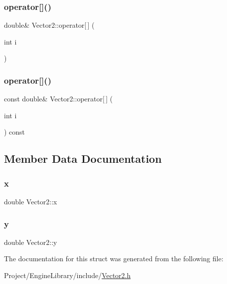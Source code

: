\mbox{\label{struct_vector2_a6c9c69723e9775ef86bb42dc8396c22e}} 
\subsubsection{\texorpdfstring{operator[]()}{operator[]()}\hspace{0.1cm}{\footnotesize\ttfamily [1/2]}}
{\footnotesize\ttfamily double\& Vector2\+::operator\mbox{[}$\,$\mbox{]} (\begin{DoxyParamCaption}\item[{int}]{i }\end{DoxyParamCaption})\hspace{0.3cm}{\ttfamily [inline]}}

\mbox{\label{struct_vector2_aae8e74dc12a621b7c3a7c1491a02223b}} 
\subsubsection{\texorpdfstring{operator[]()}{operator[]()}\hspace{0.1cm}{\footnotesize\ttfamily [2/2]}}
{\footnotesize\ttfamily const double\& Vector2\+::operator\mbox{[}$\,$\mbox{]} (\begin{DoxyParamCaption}\item[{int}]{i }\end{DoxyParamCaption}) const\hspace{0.3cm}{\ttfamily [inline]}}



\subsection{Member Data Documentation}
\mbox{\label{struct_vector2_a61d73d9036ccbb3257fbe595c014a1d0}} 
\subsubsection{\texorpdfstring{x}{x}}
{\footnotesize\ttfamily double Vector2\+::x}

\mbox{\label{struct_vector2_a4df9b2a8e79e6e30a7a3b34722d8b8b8}} 
\subsubsection{\texorpdfstring{y}{y}}
{\footnotesize\ttfamily double Vector2\+::y}



The documentation for this struct was generated from the following file\+:\begin{DoxyCompactItemize}
\item 
Project/\+Engine\+Library/include/\mbox{\hyperlink{_vector2_8h}{Vector2.\+h}}\end{DoxyCompactItemize}

